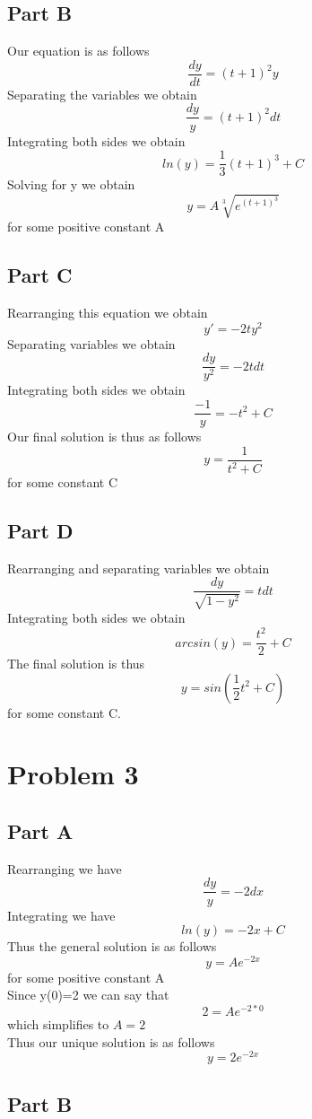 \documentclass{article}
\begin{document}
\subsection{Part B}
Our equation is as follows
\[
\frac{dy}{dt} = (t+1)^2 y
\]
Separating the variables we obtain
\[
\frac{dy}{y} = (t+1)^2 dt
\]
Integrating both sides we obtain
\[
ln(y) = \frac{1}{3} (t+1)^3 + C
\]
Solving for y we obtain
\[
y = A \sqrt[3]{e^{(t+1)^3}}
\]
for some positive constant A

\newpage

\subsection{Part C}

Rearranging this equation we obtain
\[
y' = -2t y^2
\]
Separating variables we obtain
\[
\frac{dy}{y^2} = -2t dt
\]
Integrating both sides we obtain
\[
\frac{-1}{y} = -t^2 + C
\]
Our final solution is thus as follows
\[
y = \frac{1}{t^2+C}
\]
for some constant C

\subsection{Part D}

Rearranging and separating variables we obtain
\[
\frac{dy}{\sqrt{1-y^2}} = t dt
\]
Integrating both sides we obtain
\[
arcsin(y) = \frac{t^2}{2} + C
\]
The final solution is thus
\[
y = sin(\frac{1}{2} t^2 + C)
\]
for some constant C. 
\newpage

\section{Problem 3}

\subsection{Part A}

Rearranging we have
\[
\frac{dy}{y} = -2dx
\]
Integrating we have
\[
ln(y) = -2x + C
\]
Thus the general solution is as follows
\[
y = Ae^{-2x}
\]
for some positive constant A\\
Since y(0)=2 we can say that
\[
2 = Ae^{-2*0}
\]
which simplifies to $A=2$\\
Thus our unique solution is as follows
\[
y = 2 e^{-2x}
\]
\newpage
\subsection{Part B}
\end{document}
